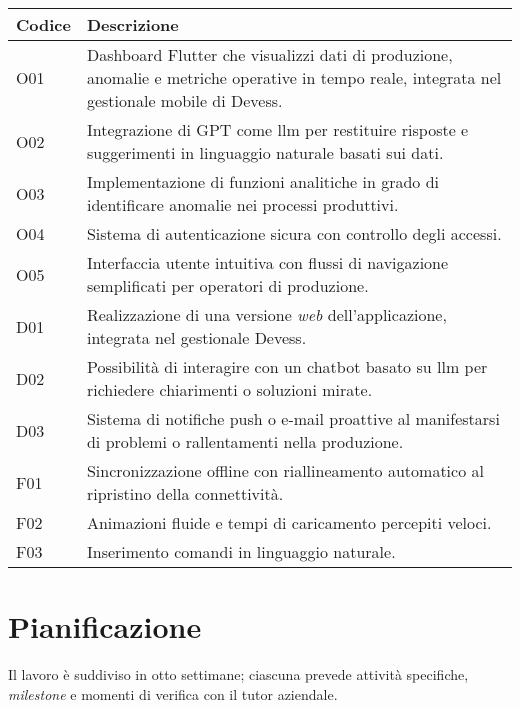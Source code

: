 \begin{center}
\brandTableColors
\begin{longtable}{|p{2.25cm}|p{12.00cm}|}
  \hline
  \textbf{Codice} & \textbf{Descrizione} \\ \hline
  \endhead
  \rowcolors{1}{tableRowA}{tableRowB}

  O01 & Dashboard Flutter che visualizzi dati di produzione, anomalie e metriche operative in tempo reale, integrata nel gestionale mobile di Devess. \\ \hline
  O02 & Integrazione di GPT come \gls{llm} per restituire risposte e suggerimenti in linguaggio naturale basati sui dati. \\ \hline
  O03 & Implementazione di funzioni analitiche in grado di identificare anomalie nei processi produttivi. \\ \hline
  O04 & Sistema di autenticazione sicura con controllo degli accessi. \\ \hline
  O05 & Interfaccia utente intuitiva con flussi di navigazione semplificati per operatori di produzione. \\ \hline
  D01 & Realizzazione di una versione \textit{web} dell'applicazione, integrata nel gestionale Devess. \\ \hline
  D02 & Possibilità di interagire con un chatbot basato su \gls{llm} per richiedere chiarimenti o soluzioni mirate. \\ \hline
  D03 & Sistema di notifiche push o e-mail proattive al manifestarsi di problemi o rallentamenti nella produzione. \\ \hline
  F01 & Sincronizzazione offline con riallineamento automatico al ripristino della connettività. \\ \hline
  F02 & Animazioni fluide e tempi di caricamento percepiti veloci. \\ \hline
  F03 & Inserimento comandi in linguaggio naturale. \\ \hline
\end{longtable}
\label{tab:requisiti_obbiettivi}
\end{center}



\section{Pianificazione}
\label{subsec:pianificazione}

Il lavoro è suddiviso in otto settimane; ciascuna prevede attività specifiche, \textit{milestone} e momenti di verifica con il tutor aziendale.

